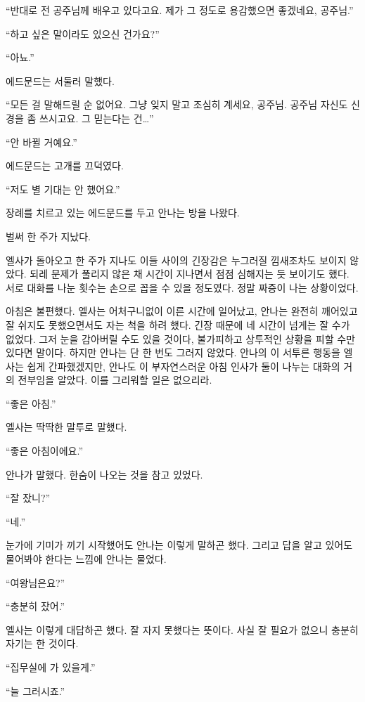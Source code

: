 ``반대로 전 공주님께 배우고 있다고요. 제가 그 정도로 용감했으면 좋겠네요, 공주님.''

`` 하고 싶은 말이라도 있으신 건가요?''

``아뇨.''

에드문드는 서둘러 말했다.

``모든 걸 말해드릴 순 없어요. 그냥 잊지 말고 조심히 계세요, 공주님. 공주님 자신도 신경을 좀 쓰시고요. 그 믿는다는 건\ldots''

``안 바뀔 거예요.''

에드문드는 고개를 끄덕였다.

``저도 별 기대는 안 했어요.''

장례를 치르고 있는 에드문드를 두고 안나는 방을 나왔다.

\textbreak

벌써 한 주가 지났다.

엘사가 돌아오고 한 주가 지나도 이들 사이의 긴장감은 누그러질 낌새조차도 보이지 않았다. 되레 문제가 풀리지 않은 채 시간이 지나면서 점점 심해지는 듯 보이기도 했다. 서로 대화를 나눈 횟수는 손으로 꼽을 수 있을 정도였다. 정말 짜증이 나는 상황이었다.

아침은 불편했다. 엘사는 어처구니없이 이른 시간에 일어났고, 안나는 완전히 깨어있고 잘 쉬지도 못했으면서도 자는 척을 하려 했다. 긴장 때문에 네 시간이 넘게는 잘 수가 없었다. 그저 눈을 감아버릴 수도 있을 것이다, 불가피하고 상투적인 상황을 피할 수만 있다면 말이다. 하지만 안나는 단 한 번도 그러지 않았다. 안나의 이 서투른 행동을 엘사는 쉽게 간파했겠지만, 안나도 이 부자연스러운 아침 인사가 둘이 나누는 대화의 거의 전부임을 알았다. 이를 그리워할 일은 없으리라.

``좋은 아침.''

엘사는 딱딱한 말투로 말했다.

``좋은 아침이에요.''

안나가 말했다. 한숨이 나오는 것을 참고 있었다.

``잘 잤니?''

``네.''

눈가에 기미가 끼기 시작했어도 안나는 이렇게 말하곤 했다. 그리고 답을 알고 있어도 물어봐야 한다는 느낌에 안나는 물었다.

``여왕님은요?''

``충분히 잤어.''

엘사는 이렇게 대답하곤 했다. 잘 자지 못했다는 뜻이다. 사실 잘 필요가 없으니 충분히 자기는 한 것이다.

``집무실에 가 있을게.''

``늘 그러시죠.''

